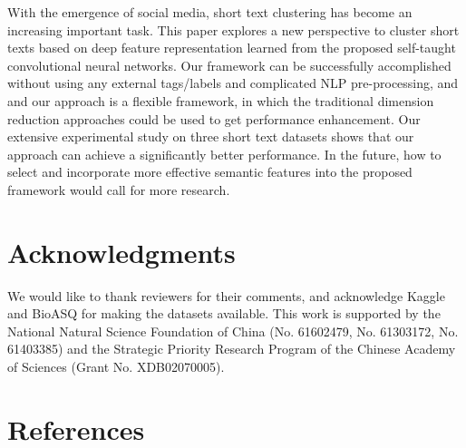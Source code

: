 \documentclass[review]{elsarticle}
\begin{document}
With the emergence of social media, short text clustering has become an increasing important task. This paper explores a new perspective to cluster short texts based on deep feature representation learned from the proposed self-taught convolutional neural networks. Our framework can be successfully accomplished without using any external tags/labels and complicated NLP pre-processing, and and our approach is a flexible framework, in which the traditional dimension reduction approaches could be used to get performance enhancement. Our extensive experimental study on three short text datasets shows that our approach can achieve a significantly better performance. In the future, how to select and incorporate more effective semantic features into the proposed framework would call for more research.



\section*{Acknowledgments}
We would like to thank reviewers for their comments, and acknowledge Kaggle and BioASQ for making the datasets available. This work is supported by the National Natural Science Foundation of China (No. 61602479, No. 61303172, No. 61403385) and the Strategic Priority Research Program of the Chinese Academy of Sciences (Grant No. XDB02070005).

\section*{References}


\end{document}
